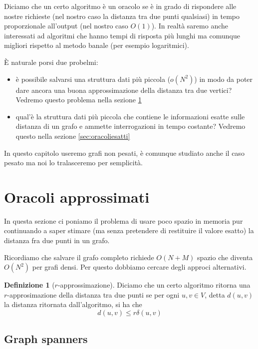 \documentclass[a4paper,10pt]{amsbook}
\newcounter{counter1}
\theoremstyle{plain}
\theoremstyle{definition}
\newtheorem{mydef}[counter1]{Definizione}
\theoremstyle{remark}
\newcommand{\pa}[1]{\left(#1\right)}
\begin{document}
Diciamo che un certo algoritmo \`e un oracolo se \`e in grado di
rispondere alle nostre richieste (nel nostro caso la distanza tra due
punti qualsiasi) in tempo proporzionale all'output (nel nostro caso
$O\pa{1}$). In realt\`a saremo anche interessati ad algoritmi che
hanno tempi di risposta pi\`u lunghi ma comunque migliori rispetto al
metodo banale (per esempio logaritmici).

\`E naturale porsi due probelmi:
\begin{itemize}
\item è possibile salvarsi una struttura dati pi\`u piccola ($o
  \pa{ N^2}$) in modo da poter dare ancora una buona approssimazione
  della distanza tra due vertici? Vedremo questo problema nella
  sezione \ref{sec:oracoliapprossimati}
\item qual'\`e la struttura dati pi\`u piccola che contiene le
  informazioni esatte sulle distanza di un grafo e ammette
  interrogazioni in tempo costante? Vedremo questo nella
  sezione \ref{sec:oracoliesatti}
\end{itemize}

In questo capitolo useremo grafi non pesati, \`e comunque studiato
anche il caso pesato ma noi lo tralasceremo per semplicit\`a.

\section{Oracoli approssimati}
\label{sec:oracoliapprossimati}

In questa sezione ci poniamo il problema di usare poco spazio in
memoria pur continuando a saper stimare (ma senza pretendere di
restituire il valore esatto) la distanza fra due punti in un grafo.

Ricordiamo che salvare il grafo completo richiede $O\pa{ N + M }$
spazio che diventa $O\pa{ N^2}$ per grafi densi. Per questo dobbiamo
cercare degli approci alternativi.

\begin{mydef}[$r$-approssimazione]
  Diciamo che un certo algoritmo ritorna una $r$-approsimazione della
  distanza tra due punti se per ogni $u,v \in V$, detta $d(u,v)$ la
  distanza ritornata dall'algoritmo, si ha che
  \[ d\pa{u,v} \le r \delta\pa{u,v} \]
\end{mydef}

\subsection{Graph spanners}
\end{document}
